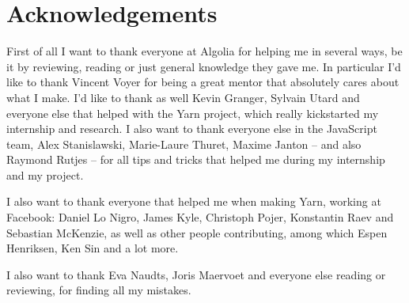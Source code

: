 
\chapter{Acknowledgements}%
\label{chp:acknowledgements}

First of all I want to thank everyone at Algolia for helping me in several ways, be it by reviewing, reading or just general knowledge they gave me. In particular I'd like to thank Vincent Voyer for being a great mentor that absolutely cares about what I make. I'd like to thank as well Kevin Granger, Sylvain Utard and everyone else that helped with the Yarn project, which really kickstarted my internship and research. I also want to thank everyone else in the JavaScript team, Alex Stanislawski, Marie-Laure Thuret, Maxime Janton -- and also Raymond Rutjes -- for all tips and tricks that helped me during my internship and my project. 

I also want to thank everyone that helped me when making Yarn, working at Facebook: Daniel Lo Nigro, James Kyle, Christoph Pojer, Konstantin Raev and Sebastian McKenzie, as well as other people contributing, among which Espen Henriksen, Ken Sin and a lot more.

I also want to thank Eva Naudts, Joris Maervoet and everyone else reading or reviewing, for finding all my mistakes.
